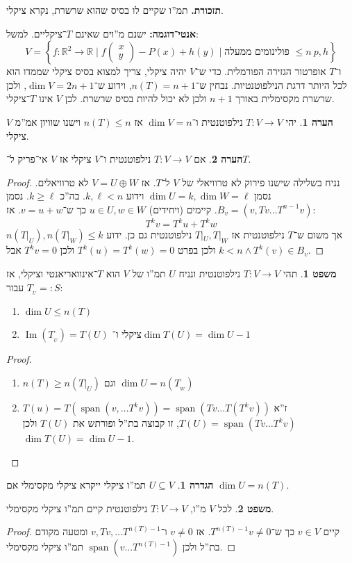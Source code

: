 \documentclass[a4paper]{article}
\newcommand\R     {\mathbb{R}}
\newcommand\ml    {\ell}
\DeclareMathOperator\Img   {Im}
\DeclareMathOperator{\Sp}      {span}
\newcommand\co        {\colon}
\newcommand\pms[1]    {\begin{pmatrix}
		#1
\end{pmatrix}}
\newcommand\ccb[1]    {\left \{ #1 \right \}}
\theoremstyle{definition}
\newtheorem{Theorem}{\color{myblue}משפט}
\newtheorem{Definition}{\color{mygreen}הגדרה}
\newtheorem{Remark}{\color{mycyan}הערה}
\newcommand\theo  [1] {\begin{Theorem}#1\end{Theorem}}
\newcommand\defi  [1] {\begin{Definition}#1\end{Definition}}
\newcommand\rmark [1] {\begin{Remark}#1\end{Remark}}
\begin{document}
	\textbf{תזכורת. }תמ''ו שקיים לו בסיס שהוא שרשרת, נקרא ציקלי. 
	
	\textbf{אנטי־דוגמה: }ישנם מ''וים שאינם $T$־ציקליים. למשל: 
	\[ V = \ccb{f \co \R^2 \to \R \mid f\pms{x \\ y} - P(x) + h(y) \mid \text{פולינומים ממעלה $\le n$} \ p, h} \]
	ו־$T$ אופרטור הגזירה הפורמלית. 
	כדי ש־$V$ יהיה ציקלי, צריך למצוא בסיס ציקלי שממדו הוא לכל היותר דרגת הנילפוטנטיות. נבחין ש־$n(T) = n  + 1$, וידוע ש־$\dim V = 2n + 1$, ולכן שרשרת מקסימלית באורך $n + 1$ ולכן לא יכול להיות בסיס שרשרת. לכן $V$ אינו $T$־ציקלי. 
	
	\rmark{יהי $T \co V \to V$ נילפוטנטית ו־$\dim V = n$ אז $n(T) \le n$ וישנו שוויון אמ''מ $V$ ציקלי. }
	
	\rmark{אם $T \co V \to V$ נילפוטנטית ו־$V$ ציקלי אז $V$ אי־פריק ל־$T$. }
	\begin{proof}
		נניח בשלילה שישנו פירוק לא טרוויאלי של $V$ ל־$T$. אז $V = U \oplus W$ לא טרוויאלים. נסמן $\dim U = k, \dim W = \ml$ וידוע $k, \ml < n$. בה''כ $k \ge \ml$. נסמן $B_v = (v, Tv \dots T^{n - 1}v)$. קיימים (ויחידים) $u \in U, w \in W$ כך ש־$v = u + w$. אז: 
		\[ T^{k}v = T^ku + T^kw \]
		אך משום ש־$T$ נילפוטנטית אז $T|_{U}, T|_{W}$ נילפוטנטית גם כן. ידוע $n(T|_{U}), n(T|_{W}) \le k$ ולכן בפרט $T^{k}(u) = T^{k}(w) = 0$ ולכן $T^{k}v = 0$ אבל $k < n \land T^k(v) \in B_v$. 
	\end{proof}
	
	\theo{תהי $T \co V \to V$ נילפוטנטית ונניח $U$ תמ''ו של $V$ הוא $T$־אינוואריאנטי וציקלי, אז עבור $T_{_U} =: S$: 
		\begin{enumerate}
			\item $\dim U \le n(T)$
			\item $\Img(T_{_U}) = T(U)$ ציקלי ו־$\dim T(U) = \dim U - 1$
	\end{enumerate}}
	\begin{proof}\,
		\begin{enumerate}
			\item $n(T) \ge n(T|_{U})$ וגם $\dim U = n(T_{_W})$
			\item $T(u) = T(\Sp(v, \dots T^{k}v)) = \Sp (Tv \dots T(T^k v))$ ז''א $T(U) = \Sp(Tv \dots T^k v)$, זו קבוצה בת''ל ופורתש את $T(U)$ ולכן $\dim T(U) = \dim U - 1$. 
		\end{enumerate}
	\end{proof}
	
	\defi{$U \subseteq V$ תמ''ו ציקלי ייקרא ציקלי מקסימלי אם $\dim U = n(T)$. }
	\theo{לכל $V$ מ''ו, $T \co V \to V$ נילפוטנטית קיים תמ''ו ציקלי מקסימלי. }
	\begin{proof}
		קיים $v \in V$ כך ש־$T^{n(T) - 1}v \neq 0$. אז $v \neq 0$ ו־$v, Tv, \dots T^{n(T) - 1}$ ומטעה מקודם בת''ל ולכן $\Sp(v \dots T^{n(T) -1})$ תמ''ו ציקלי מקסימלי. 
	\end{proof}
	
\end{document}
